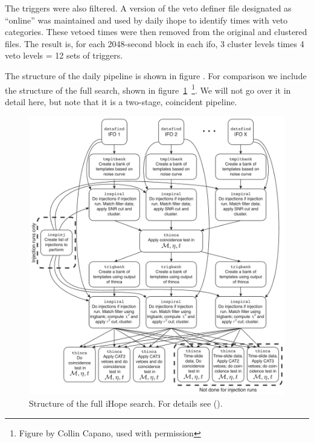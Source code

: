 The triggers were also filtered.  A version of the veto definer file
designated as ``online'' was maintained and used by daily ihope to
identify times with veto categories.  These vetoed times were then
removed from the original and clustered files.  
The result is, for each 2048-second block in each ifo, 3 cluster
levels times 4 veto levels = 12 sets of triggers.

The structure of the daily pipeline is shown in figure .  For comparison we include the structure of the full search,
shown in figure~\ref{f:hipe}~\footnote{Figure by Collin Capano, used
with permission}.  We will not go over it in detail here, but note
that it is a two-stage, coincident pipeline.

\begin{figure}
  \includegraphics[width=\linewidth]{figures/detchar/HIPEDiagram}
  \caption[Structure of the full iHope search]{
  \label{f:hipe}
Structure of the full iHope search.  For details see ().
}
\end{figure}%


